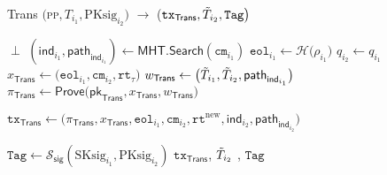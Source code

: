 \begin{algorithm}[h]
	\caption{\textsf{Trans} $\big($\textsc{pp}$, T_{i_1},  \text{PKsig}_{i_2} \big)$ $\rightarrow$ \big($\texttt{tx}_{\textsf{Trans}}, \Tilde{T}_{i_2}, \texttt{Tag}\big)$}\label{alg:trans}
	\begin{algorithmic}[1]
		 {}
		\State \Return $\perp$
		\EndIf
		\State $(\mathsf{ind}_{i_1}, \mathsf{path}_{\mathsf{ind}_{i_1}}) \gets \mathsf{MHT}.\mathsf{Search}(\texttt{cm}_{i_1})$
		\State $\texttt{eol}_{i_1} \gets \mathcal{H} \big( \rho_{i_1}\big)$
		\State $q_{i_2} \gets q_{i_1}$
		\State $x_\textsf{Trans} \gets \big(\texttt{eol}_{i_1}, \texttt{cm}_{i_2}, \texttt{rt}_\tau \big)$
		\State $w_\textsf{Trans} \gets \big( \Tilde{T}_{i_1}, \Tilde{T}_{i_2}, \mathsf{path}_{\mathsf{ind}_{i_1}}\big)$
		\State $\pi_{\textsf{Trans}} \gets \textsf{Prove}\big(\mathsf{pk}_{\textsf{Trans}}, x_{\textsf{Trans}}, w_{\textsf{Trans}}\big)$
		
		\State$\texttt{tx}_{\textsf{Trans}} \gets \big(\pi_{\textsf{Trans}}, x_{\textsf{Trans}}, \texttt{eol}_{i_1}, \texttt{cm}_{i_2}, \texttt{rt}^{\text{new}}, \mathsf{ind}_{i_2}, \mathsf{path}_{\mathsf{ind}_{i_2}} \big)$
		
		\State $\texttt{Tag} \leftarrow \mathcal{S}_\mathsf{sig}(\text{SKsig}_{i_1}, \text{PKsig}_{i_2})$
		\State \Return $\texttt{tx}_{\textsf{Trans}}$, $\Tilde{T}_{i_2}$ , $\texttt{Tag}$
	\end{algorithmic}
\end{algorithm}


